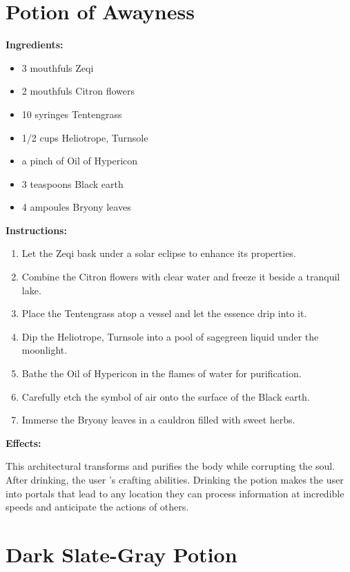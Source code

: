 \documentclass{article}
\begin{document}
\newpage
\section*{Potion of Awayness}

\textbf{Ingredients:}

\begin{itemize}
  \item 3 mouthfuls Zeqi
  \item 2 mouthfuls Citron flowers
  \item 10 syringes Tentengrass
  \item 1/2 cups Heliotrope, Turnsole
  \item a pinch of Oil of Hypericon
  \item 3 teaspoons Black earth
  \item 4 ampoules Bryony leaves
\end{itemize}

\textbf{Instructions:}

\begin{enumerate}
  \item Let the Zeqi bask under a solar eclipse to enhance its properties.
  \item Combine the Citron flowers with clear water and freeze it beside a tranquil lake.
  \item Place the Tentengrass atop a vessel and let the essence drip into it.
  \item Dip the Heliotrope, Turnsole into a pool of sagegreen liquid under the moonlight.
  \item Bathe the Oil of Hypericon in the flames of water for purification.
  \item Carefully etch the symbol of air onto the surface of the Black earth.
  \item Immerse the Bryony leaves in a cauldron filled with sweet herbs.
\end{enumerate}

\textbf{Effects:}

This architectural transforms and purifies the body while corrupting the soul. After drinking, the user 's crafting abilities. Drinking the potion makes the user into portals that lead to any location they can process information at incredible speeds and anticipate the actions of others.

\newpage
\section*{Dark Slate-Gray Potion}
\end{document}
